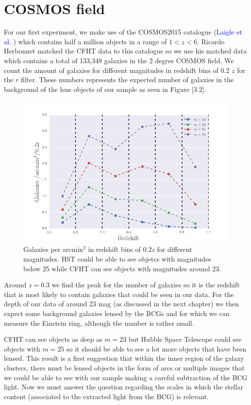 \section{COSMOS field}

For our first experiment, we make use of the COSMOS2015 catalogue (\textcolor{blue}{Laigle et al.} \citeyear{Reference21}) which contains half a million objects in a range of $1<z<6$. Ricardo Herbonnet matched the CFHT data to this catalogue so we use his matched data which contains a total of 133,348 galaxies in the 2 degree COSMOS field. We count the amount of galaxies for different magnitudes in redshift bins of 0.2 $z$ for the $r$ filter. These numbers represents the expected number of galaxies in the background of the lens objects of our sample as seen in Figure [3.2]. 

\begin{figure}[H]
\centering
\includegraphics[width=12cm]{images/galaxies_per_arcmin.png}
\caption[Galaxies per arcmin]{Galaxies per arcmin$^2$ in redshift bins of $0.2z$ for different magnitudes. HST could be able to see objetcs with magnitudes below 25 while CFHT can see objects with magnitudes around 23.}
\end{figure}

Around $z=0.3$ we find the peak for the number of galaxies so it is the redshift that is most likely to contain galaxies that could be seen in our data. For the depth of our data of around 23 mag (as discussed in the next chapter) we then expect some background galaxies lensed by the BCGs and for which we can measure the Einstein ring, although the number is rather small. 

CFHT can see objects as deep as $m=23$ but Hubble Space Telescope could see objects with $m=25$ so it should be able to see a lot more objects that have been lensed. This result is a first suggestion that within the inner region of the galaxy clusters, there must be lensed objects in the form of arcs or multiple images that we could be able to see with our sample making a careful subtraction of the BCG light. Now we must answer the question regarding the scales in which the stellar content (associated to the extracted light from the BCG) is relevant.

